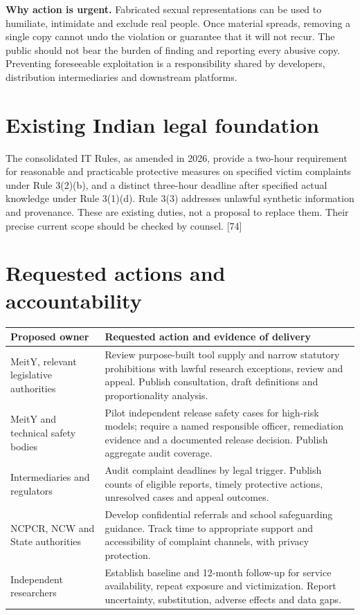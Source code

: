 \documentclass[11pt,a4paper]{article}
\begin{document}
\textbf{Why action is urgent.} Fabricated sexual representations can be used to humiliate, intimidate and exclude real people. Once material spreads, removing a single copy cannot undo the violation or guarantee that it will not recur. The public should not bear the burden of finding and reporting every abusive copy. Preventing foreseeable exploitation is a responsibility shared by developers, distribution intermediaries and downstream platforms.

\section*{Existing Indian legal foundation}
The consolidated IT Rules, as amended in 2026, provide a two-hour requirement for reasonable and practicable protective measures on specified victim complaints under Rule 3(2)(b), and a distinct three-hour deadline after specified actual knowledge under Rule 3(1)(d). Rule 3(3) addresses unlawful synthetic information and provenance. These are existing duties, not a proposal to replace them. Their precise current scope should be checked by counsel. [74]
\newpage
\section*{Requested actions and accountability}
\begin{tabularx}{\linewidth}{@{}p{.25\linewidth}X@{}}\toprule
\textbf{Proposed owner} & \textbf{Requested action and evidence of delivery}\\\midrule
MeitY, relevant legislative authorities & Review purpose-built tool supply and narrow statutory prohibitions with lawful research exceptions, review and appeal. Publish consultation, draft definitions and proportionality analysis.\\
MeitY and technical safety bodies & Pilot independent release safety cases for high-risk models; require a named responsible officer, remediation evidence and a documented release decision. Publish aggregate audit coverage.\\
Intermediaries and regulators & Audit complaint deadlines by legal trigger. Publish counts of eligible reports, timely protective actions, unresolved cases and appeal outcomes.\\
NCPCR, NCW and State authorities & Develop confidential referrals and school safeguarding guidance. Track time to appropriate support and accessibility of complaint channels, with privacy protection.\\
Independent researchers & Establish baseline and 12-month follow-up for service availability, repeat exposure and victimization. Report uncertainty, substitution, adverse effects and data gaps.\\\bottomrule\end{tabularx}
\end{document}
